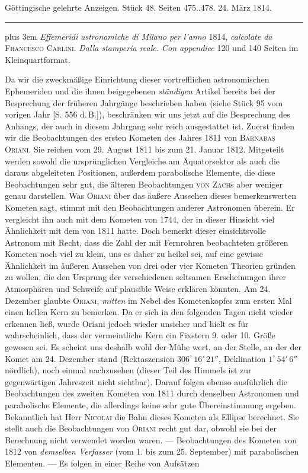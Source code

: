 \clearpage
{}
\hypertarget{native-571-lower}{}
\begin{center}\small Göttingische gelehrte Anzeigen. Stück 48. Seiten 475..478. 24. März 1814.\\[3pt]\rule{.72\linewidth}{.3pt}\end{center}

{\rightskip=0pt plus 3em \emph{Effemeridi astronomiche di Milano per l'anno} 1814, \emph{calcolate da} \textsc{Francesco Carlini}. \emph{Dalla stamperia reale. Con appendice} 120 und 140 Seiten im Kleinquartformat.\par}

Da wir die zweckmäßige Einrichtung dieser vortrefflichen astronomischen Ephemeriden und die ihnen beigegebenen \emph{ständigen} Artikel bereits bei der Besprechung der früheren Jahrgänge beschrieben haben (siehe Stück 95 vom vorigen Jahr [S. 556 d.\,B.]), beschränken wir uns jetzt auf die Besprechung des Anhangs, der auch in diesem Jahrgang sehr reich ausgestattet ist. Zuerst finden wir die Beobachtungen des ersten Kometen des Jahres 1811 von \textsc{Barnabas Oriani}. Sie reichen vom 29. August 1811 bis zum 21. Januar 1812. Mitgeteilt werden sowohl die ursprünglichen Vergleiche am Äquatorsektor als auch die daraus abgeleiteten Positionen, außerdem parabolische Elemente, die diese Beobachtungen sehr gut, die älteren Beobachtungen \textsc{von Zach}s aber weniger genau darstellen. Was \textsc{Oriani} über das äußere Aussehen dieses bemerkenswerten Kometen sagt, stimmt mit den Beobachtungen anderer Astronomen überein. Er vergleicht ihn auch mit dem Kometen von 1744, der in dieser Hinsicht viel Ähnlichkeit mit dem von 1811 hatte. Doch bemerkt dieser einsichtsvolle Astronom mit Recht, dass die Zahl der mit Fernrohren beobachteten größeren Kometen noch viel zu klein, uns es daher zu heikel sei, auf eine gewisse Ähnlichkeit im äußeren Aussehen von drei oder vier Kometen Theorien gründen zu wollen, die den Ursprung der verschiedenen seltsamen Erscheinungen ihrer Atmosphären und Schweife auf plausible Weise erklären könnten. Am 24. Dezember glaubte \textsc{Oriani}, \emph{mitten} im Nebel des Kometenkopfes zum ersten Mal einen hellen Kern zu bemerken. Da er sich in den folgenden Tagen nicht wieder erkennen ließ, wurde Oriani jedoch wieder unsicher und hielt es für wahrscheinlich, dass der vermeintliche Kern ein Fixstern 9. oder 10. Größe gewesen sei. Es scheint uns deshalb wohl der Mühe wert, an der Stelle, an der der Komet am 24. Dezember stand (Rektaszension $306^\circ\,16'\,21''$, Deklination $1^\circ\,54'\,6''$ nördlich), noch einmal nachzusehen (dieser Teil des Himmels ist zur gegenwärtigen Jahreszeit nicht sichtbar). Darauf folgen ebenso ausführlich die Beobachtungen des zweiten Kometen von 1811 durch denselben Astronomen und parabolische Elemente, die allerdings keine sehr gute Übereinstimmung ergeben. Bekanntlich hat Herr \textsc{Nicolai} die Bahn dieses Kometen als Ellipse berechnet. Sie stellt auch die Beobachtungen von \textsc{Oriani} recht gut dar, obwohl sie bei der Berechnung nicht verwendet worden waren. --- Beobachtungen des Kometen von 1812 von \emph{demselben Verfasser} (vom 1. bis zum 25. September) mit parabolischen Elementen. --- Es folgen in einer Reihe von Aufsätzen 